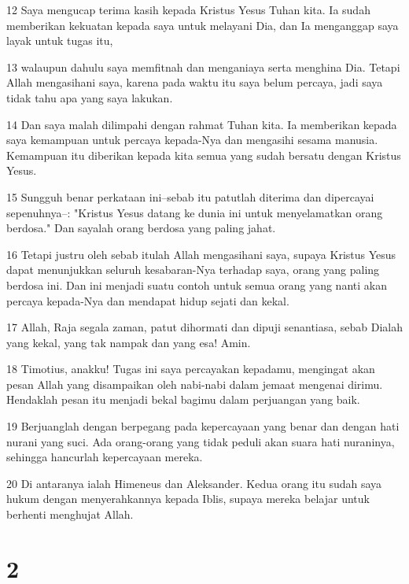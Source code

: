 \par 12 Saya mengucap terima kasih kepada Kristus Yesus Tuhan kita. Ia sudah memberikan kekuatan kepada saya untuk melayani Dia, dan Ia menganggap saya layak untuk tugas itu,
\par 13 walaupun dahulu saya memfitnah dan menganiaya serta menghina Dia. Tetapi Allah mengasihani saya, karena pada waktu itu saya belum percaya, jadi saya tidak tahu apa yang saya lakukan.
\par 14 Dan saya malah dilimpahi dengan rahmat Tuhan kita. Ia memberikan kepada saya kemampuan untuk percaya kepada-Nya dan mengasihi sesama manusia. Kemampuan itu diberikan kepada kita semua yang sudah bersatu dengan Kristus Yesus.
\par 15 Sungguh benar perkataan ini--sebab itu patutlah diterima dan dipercayai sepenuhnya--: "Kristus Yesus datang ke dunia ini untuk menyelamatkan orang berdosa." Dan sayalah orang berdosa yang paling jahat.
\par 16 Tetapi justru oleh sebab itulah Allah mengasihani saya, supaya Kristus Yesus dapat menunjukkan seluruh kesabaran-Nya terhadap saya, orang yang paling berdosa ini. Dan ini menjadi suatu contoh untuk semua orang yang nanti akan percaya kepada-Nya dan mendapat hidup sejati dan kekal.
\par 17 Allah, Raja segala zaman, patut dihormati dan dipuji senantiasa, sebab Dialah yang kekal, yang tak nampak dan yang esa! Amin.
\par 18 Timotius, anakku! Tugas ini saya percayakan kepadamu, mengingat akan pesan Allah yang disampaikan oleh nabi-nabi dalam jemaat mengenai dirimu. Hendaklah pesan itu menjadi bekal bagimu dalam perjuangan yang baik.
\par 19 Berjuanglah dengan berpegang pada kepercayaan yang benar dan dengan hati nurani yang suci. Ada orang-orang yang tidak peduli akan suara hati nuraninya, sehingga hancurlah kepercayaan mereka.
\par 20 Di antaranya ialah Himeneus dan Aleksander. Kedua orang itu sudah saya hukum dengan menyerahkannya kepada Iblis, supaya mereka belajar untuk berhenti menghujat Allah.

\chapter{2}

